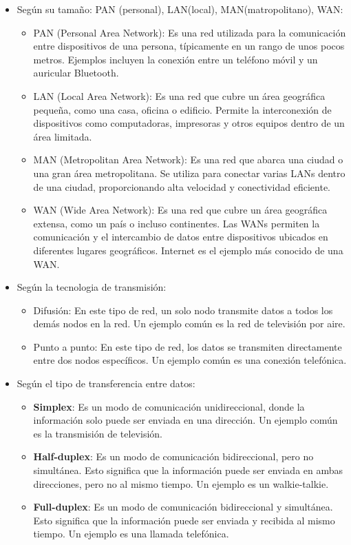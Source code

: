 \documentclass[a4paper,12pt]{article}
\begin{document}
\begin{itemize}
    \item Según su tamaño: PAN (personal), LAN(local), MAN(matropolitano), WAN:
    \begin{itemize}
        \item PAN (Personal Area Network): Es una red utilizada para la comunicación entre dispositivos de una persona, típicamente en un rango de unos pocos metros. Ejemplos incluyen la conexión entre un teléfono móvil y un auricular Bluetooth.
        \item LAN (Local Area Network): Es una red que cubre un área geográfica pequeña, como una casa, oficina o edificio. Permite la interconexión de dispositivos como computadoras, impresoras y otros equipos dentro de un área limitada.
        \item MAN (Metropolitan Area Network): Es una red que abarca una ciudad o una gran área metropolitana. Se utiliza para conectar varias LANs dentro de una ciudad, proporcionando alta velocidad y conectividad eficiente.
        \item WAN (Wide Area Network): Es una red que cubre un área geográfica extensa, como un país o incluso continentes. Las WANs permiten la comunicación y el intercambio de datos entre dispositivos ubicados en diferentes lugares geográficos. Internet es el ejemplo más conocido de una WAN.
    \end{itemize}
    \item Según la tecnologia de transmisión:
    \begin{itemize}
        \item Difusión: En este tipo de red, un solo nodo transmite datos a todos los demás nodos en la red. Un ejemplo común es la red de televisión por aire.
        \item Punto a punto: En este tipo de red, los datos se transmiten directamente entre dos nodos específicos. Un ejemplo común es una conexión telefónica.
    \end{itemize}
    \item Según el tipo de transferencia entre datos:
    \begin{itemize}
        \item \textbf{Simplex}: Es un modo de comunicación unidireccional, donde la información solo puede ser enviada en una dirección. Un ejemplo común es la transmisión de televisión.
        \item \textbf{Half-duplex}: Es un modo de comunicación bidireccional, pero no simultánea. Esto significa que la información puede ser enviada en ambas direcciones, pero no al mismo tiempo. Un ejemplo es un walkie-talkie.
        \item \textbf{Full-duplex}: Es un modo de comunicación bidireccional y simultánea. Esto significa que la información puede ser enviada y recibida al mismo tiempo. Un ejemplo es una llamada telefónica.
    \end{itemize}
\end{itemize}
\end{document}
